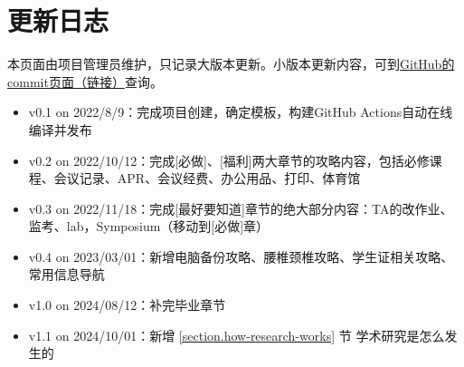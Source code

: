 \chapter{更新日志}

本页面由项目管理员维护，只记录大版本更新。小版本更新内容，可到\href{https://github.com/xp-pgrs-unofficial-guide/xp_pgrs_unofficial_guide/commits/main}{GitHub的commit页面（链接）}查询。

\begin{itemize}
    \item v0.1 on 2022/8/9：完成项目创建，确定模板，构建GitHub Actions自动在线编译并发布
    \item v0.2 on 2022/10/12：完成[必做]、[福利]两大章节的攻略内容，包括必修课程、会议记录、APR、会议经费、办公用品、打印、体育馆
    \item v0.3 on 2022/11/18：完成[最好要知道]章节的绝大部分内容：TA的改作业、监考、lab，Symposium（移动到[必做]章）
    \item v0.4 on 2023/03/01：新增电脑备份攻略、腰椎颈椎攻略、学生证相关攻略、常用信息导航
    \item v1.0 on 2024/08/12：补完毕业章节
    \item v1.1 on 2024/10/01：新增 \ref{section.how-research-works} 节 \space 学术研究是怎么发生的
\end{itemize}


